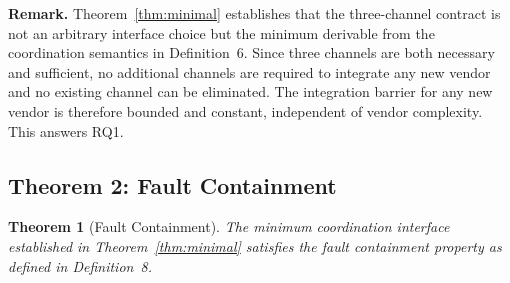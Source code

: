 \documentclass[a4paper,fleqn]{cas-dc}
\newtheorem{theorem}{Theorem}
\begin{document}
\noindent\textbf{Remark.} Theorem~\ref{thm:minimal} establishes that the three-channel contract is not an arbitrary interface choice but the minimum derivable from the coordination semantics in Definition~6. Since three channels are both necessary and sufficient, no additional channels are required to integrate any new vendor and no existing channel can be eliminated. The integration barrier for any new vendor is therefore bounded and constant, independent of vendor complexity. This answers RQ1.

\subsection{Theorem 2: Fault Containment}

\begin{theorem}[Fault Containment]
\label{thm:fault}
The minimum coordination interface established in Theorem~\ref{thm:minimal} satisfies the fault containment property as defined in Definition~8.
\end{theorem}
\end{document}
